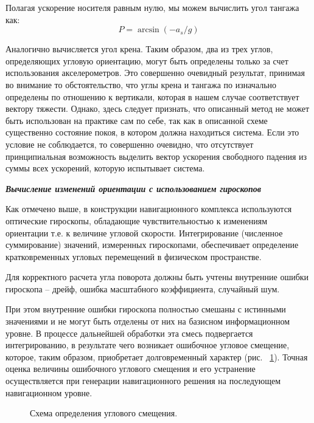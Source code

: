 Полагая ускорение носителя равным нулю, мы можем вычислить угол тангажа как:
$$P = \arcsin (-a_s/g)$$

Аналогично вычисляется угол крена. Таким образом, два из трех углов, определяющих угловую ориентацию, могут быть определены только за счет использования акселерометров. Это совершенно очевидный результат, принимая во внимание то обстоятельство, что углы крена и тангажа по изначально определены по отношению к вертикали, которая в нашем случае соответствует вектору тяжести. Однако, здесь следует признать, что описанный метод не может быть использован на практике сам по себе, так как в описанной схеме существенно состояние покоя, в котором должна находиться система. Если это условие не соблюдается, то совершенно очевидно, что отсутствует принципиальная возможность выделить вектор ускорения свободного падения из суммы всех ускорений, которую испытывает система.

\textit{\textbf{Вычисление изменений ориентации с использованием гироскопов}}

Как отмечено выше, в конструкции навигационного комплекса используются оптические гироскопы, обладающие чувствительностью к изменениям ориентации т.е. к величине угловой скорости. Интегрирование (численное суммирование) значений, измеренных гироскопами, обеспечивает определение кратковременных угловых перемещений в физическом пространстве.

Для корректного расчета угла поворота должны быть учтены
внутренние ошибки гироскопа – дрейф, ошибка масштабного коэффициента, случайный шум.

\label{ref:dreif0}
При этом внутренние ошибки  гироскопа полностью смешаны с истинными значениями и не могут быть отделены от них на базисном информационном уровне. В процессе дальнейшей обработки эта смесь подвергается интегрированию, в результате чего возникает ошибочное угловое смещение, которое, таким образом, приобретает долговременный характер (рис. ~\ref{pic:acell}). Точная оценка величины ошибочного углового смещения и его устранение осуществляется при генерации навигационного решения на последующем навигационном уровне.

\begin{figure}[!htb]
\caption{Схема определения углового смещения.}
\label{pic:acell}
\end{figure}

